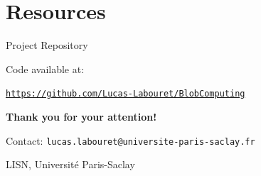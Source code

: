 \documentclass{beamer}
\begin{document}
\section{Resources}

\begin{frame}{Project Repository}
    \begin{center}
        Code available at:
        
        \vspace{0.5cm}
        
        \texttt{\url{https://github.com/Lucas-Labouret/BlobComputing}}
    \end{center}
\end{frame}

\begin{frame}[plain]
    \begin{center}
        \Large
        \textbf{Thank you for your attention!}
        
        \vspace{2cm}
        
        \normalsize
        Contact: \texttt{lucas.labouret@universite-paris-saclay.fr}
        
        \vspace{1cm}
        
        LISN, Université Paris-Saclay
    \end{center}
\end{frame}
\end{document}

